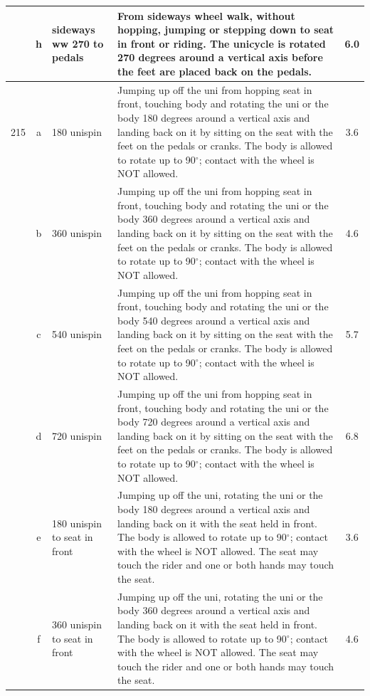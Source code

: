\begin{longtable}{|r|c|p{4cm}|p{8cm}|c|}
\hline
  & h & sideways ww 270 to pedals & From sideways wheel walk, without hopping, jumping or stepping down to seat in front or riding. The unicycle is rotated 270 degrees around a vertical axis before the feet are placed back on the pedals. & 6.0 \\ 
\hline
215 & a & 180 unispin & Jumping up off the uni from hopping seat in front, touching body and rotating the uni or the body 180 degrees around a vertical axis and landing back on it by sitting on the seat with the feet on the pedals or cranks. The body is allowed to rotate up to 90$^\circ$; contact with the wheel is NOT allowed. & 3.6 \\ 
\hline
  & b & 360 unispin & Jumping up off the uni from hopping seat in front, touching body and rotating the uni or the body 360 degrees around a vertical axis and landing back on it by sitting on the seat with the feet on the pedals or cranks. The body is allowed to rotate up to 90$^\circ$; contact with the wheel is NOT allowed. & 4.6 \\ 
\hline
  & c & 540 unispin & Jumping up off the uni from hopping seat in front, touching body and rotating the uni or the body 540 degrees around a vertical axis and landing back on it by sitting on the seat with the feet on the pedals or cranks. The body is allowed to rotate up to 90$^\circ$; contact with the wheel is NOT allowed. & 5.7 \\ 
\hline
  & d & 720 unispin & Jumping up off the uni from hopping seat in front, touching body and rotating the uni or the body 720 degrees around a vertical axis and landing back on it by sitting on the seat with the feet on the pedals or cranks. The body is allowed to rotate up to 90$^\circ$; contact with the wheel is NOT allowed. & 6.8 \\ 
\hline
  & e & 180 unispin to seat in front  & Jumping up off the uni, rotating the uni or the body 180 degrees around a vertical axis and landing back on it with the seat held in front. The body is allowed to rotate up to 90$^\circ$; contact with the wheel is NOT allowed. The seat may touch the rider and one or both hands may touch the seat.  & 3.6 \\ 
\hline
  & f & 360 unispin to seat in front  & Jumping up off the uni, rotating the uni or the body 360 degrees around a vertical axis and landing back on it with the seat held in front. The body is allowed to rotate up to 90$^\circ$; contact with the wheel is NOT allowed. The seat may touch the rider and one or both hands may touch the seat.  & 4.6 \\ 

\end{longtable}

